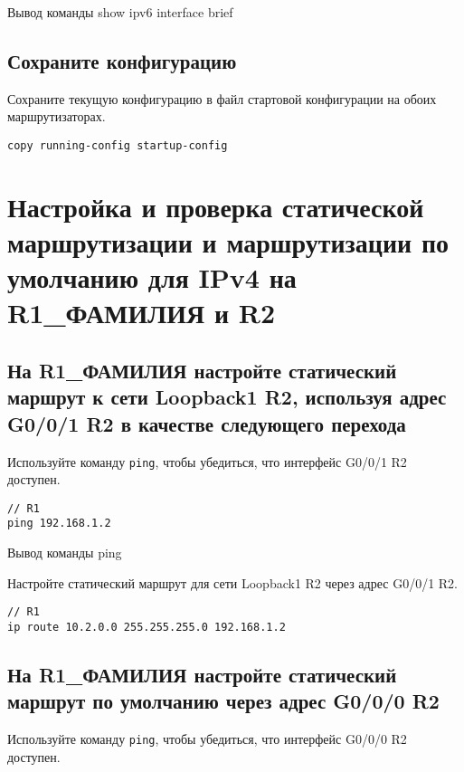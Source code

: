 \begin{image}
    \caption{Вывод команды show ipv6 interface brief}
\end{image}

\subsection{Сохраните конфигурацию}

Сохраните текущую конфигурацию в файл стартовой конфигурации
на обоих маршрутизаторах.

\begin{verbatim}
copy running-config startup-config
\end{verbatim}

\section{Настройка и проверка статической маршрутизации и
маршрутизации по умолчанию для IPv4 на R1\_ФАМИЛИЯ и R2}

\subsection{На R1\_ФАМИЛИЯ настройте статический маршрут к сети Loopback1 R2,
    используя адрес G0/0/1 R2 в качестве следующего перехода}

Используйте команду \texttt{ping}, чтобы убедиться,
что интерфейс G0/0/1 R2 доступен.

\begin{verbatim}
// R1
ping 192.168.1.2
\end{verbatim}

\begin{image}
    \caption{Вывод команды ping}
\end{image}

Настройте статический маршрут для сети Loopback1 R2 через адрес G0/0/1 R2.

\begin{verbatim}
// R1
ip route 10.2.0.0 255.255.255.0 192.168.1.2
\end{verbatim}

\subsection{На R1\_ФАМИЛИЯ настройте статический маршрут
по умолчанию через адрес G0/0/0 R2}

Используйте команду \texttt{ping}, чтобы убедиться,
что интерфейс G0/0/0 R2 доступен.

